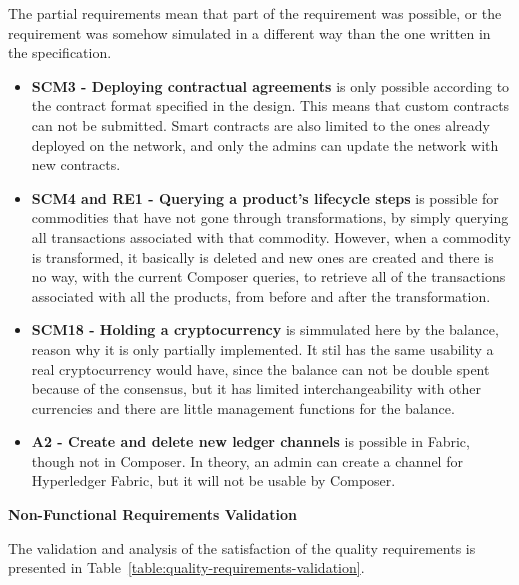The partial requirements mean that part of the requirement was possible, or the requirement was somehow simulated in a different way than the one written in the specification.

\begin{itemize}
	\item \textbf{SCM3 - Deploying contractual agreements} is only possible according to the contract format specified in the design. This means that custom contracts can not be submitted. Smart contracts are also limited to the ones already deployed on the network, and only the admins can update the network with new contracts.
	\item \textbf{SCM4 and RE1 - Querying a product's lifecycle steps} is possible for commodities that have not gone through transformations, by simply querying all transactions associated with that commodity. However, when a commodity is transformed, it basically is deleted and new ones are created and there is no way, with the current Composer queries, to retrieve all of the transactions associated with all the products, from before and after the transformation.
	\item \textbf{SCM18 - Holding a cryptocurrency} is simmulated here by the balance, reason why it is only partially implemented. It stil has the same usability a real cryptocurrency would have, since the balance can not be double spent because of the consensus, but it has limited interchangeability with other currencies and there are little management functions for the balance.
	\item \textbf{A2 - Create and delete new ledger channels} is possible in Fabric, though not in Composer. In theory, an admin can create a channel for Hyperledger Fabric, but it will not be usable by Composer.
\end{itemize}

\par \textbf{Non-Functional Requirements Validation}

The validation and analysis of the satisfaction of the quality requirements is presented in Table~\ref{table:quality-requirements-validation}.

